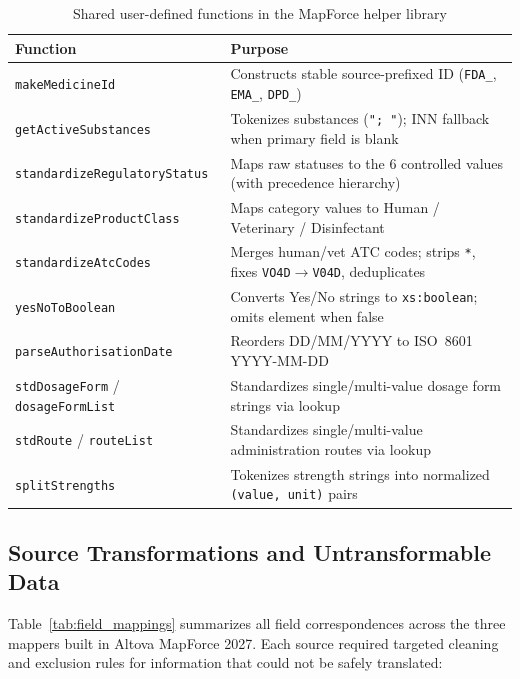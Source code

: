\documentclass{llncs}
\begin{document}
\begin{table}[htbp]
\centering
\caption{Shared user-defined functions in the MapForce helper library}
\label{tab:udfs}
\scriptsize
\setlength{\tabcolsep}{2.5pt}
\begin{tabularx}{\textwidth}{|l|>{\raggedright\arraybackslash}X|}
\hline
\textbf{Function} & \textbf{Purpose} \\
\hline
\texttt{makeMedicineId} & Constructs stable source-prefixed ID (\texttt{FDA\_}, \texttt{EMA\_}, \texttt{DPD\_}) \\
\texttt{getActiveSubstances} & Tokenizes substances (\texttt{"; "}); INN fallback when primary field is blank \\
\texttt{standardizeRegulatoryStatus} & Maps raw statuses to the 6 controlled values (with precedence hierarchy) \\
\texttt{standardizeProductClass} & Maps category values to Human / Veterinary / Disinfectant \\
\texttt{standardizeAtcCodes} & Merges human/vet ATC codes; strips \texttt{*}, fixes \texttt{VO4D}$\rightarrow$\texttt{V04D}, deduplicates \\
\texttt{yesNoToBoolean} & Converts Yes/No strings to \texttt{xs:boolean}; omits element when false \\
\texttt{parseAuthorisationDate} & Reorders DD/MM/YYYY to ISO~8601 YYYY-MM-DD \\
\texttt{stdDosageForm} / \texttt{dosageFormList} & Standardizes single/multi-value dosage form strings via lookup \\
\texttt{stdRoute} / \texttt{routeList} & Standardizes single/multi-value administration routes via lookup \\
\texttt{splitStrengths} & Tokenizes strength strings into normalized \texttt{(value, unit)} pairs \\
\hline
\end{tabularx}
\end{table}

\subsection{Source Transformations and Untransformable Data}

Table~\ref{tab:field_mappings} summarizes all field correspondences across the three mappers built in Altova MapForce 2027. Each source required targeted cleaning and exclusion rules for information that could not be safely translated:
\end{document}

